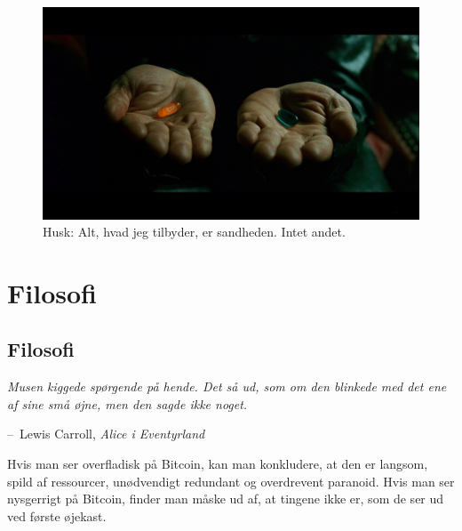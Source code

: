 \documentclass[paper=6in:9in,pagesize=pdftex,headinclude=on,footinclude=on,12pt]{scrbook}
\makeatletter
\newenvironment{chapquote}[2][4em]{\setlength{\@tempdima}{#1}%
   \def\chapquote@author{#2}%
   \parshape 1 \@tempdima \dimexpr\textwidth-2\@tempdima\relax%
   \itshape}{\par\normalfont\hfill--\ \chapquote@author\hspace*{\@tempdima}\par\bigskip}
\makeatother
\begin{document}
\begin{figure}
  \includegraphics{assets/images/bitcoin-orange-pill.jpg}
  \caption*{Husk: Alt, hvad jeg tilbyder, er sandheden. Intet andet.}
  \label{fig:bitcoin-orange-pill}
\end{figure}%
%
%

\part{Filosofi}
\label{ch:philosophy}
\chapter*{Filosofi}

\begin{chapquote}{Lewis Carroll, \textit{Alice i Eventyrland}} Musen kiggede spørgende på hende. Det så ud, som om den blinkede med det ene af sine små øjne, men den sagde ikke noget. \end{chapquote}

Hvis man ser overfladisk på Bitcoin, kan man konkludere, at den er langsom, spild af ressourcer, unødvendigt redundant og overdrevent paranoid. Hvis man ser nysgerrigt på Bitcoin, finder man måske ud af, at tingene ikke er, som de ser ud ved første øjekast.
\end{document}
